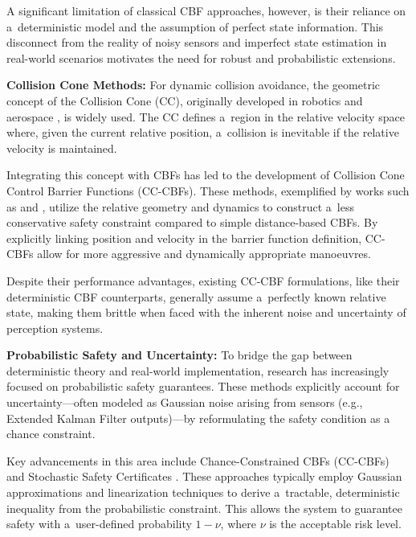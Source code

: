\documentclass{svproc}
\begin{document}
A significant limitation of classical CBF approaches, however, is their reliance
on a~deterministic model and the assumption of perfect state information. This
disconnect from the reality of noisy sensors and imperfect state estimation in
real-world scenarios motivates the need for robust and probabilistic extensions.

\textbf{Collision Cone Methods:}
For dynamic collision avoidance, the geometric concept of the Collision Cone
(CC), originally developed in robotics and aerospace
\cite{chakravarthy1998collision}, is widely used. The CC defines a~region in
the relative velocity space where, given the current relative position,
a~collision is inevitable if the relative velocity is maintained.

Integrating this concept with CBFs has led to the development of Collision Cone
Control Barrier Functions (CC-CBFs). These methods, exemplified by works such as
\cite{wang2022observer} and \cite{tayal2024collisionconeapproachcontrol},
utilize the relative geometry and dynamics to construct a~less conservative
safety constraint compared to simple distance-based CBFs. By explicitly linking
position and velocity in the barrier function definition, CC-CBFs allow for more
aggressive and dynamically appropriate manoeuvres.

Despite their performance advantages, existing CC-CBF formulations, like their
deterministic CBF counterparts, generally assume a~perfectly known relative
state, making them brittle when faced with the inherent noise
and uncertainty of perception systems.

\textbf{Probabilistic Safety and Uncertainty:}
To bridge the gap between deterministic theory and real-world implementation,
research has increasingly focused on probabilistic safety guarantees. These
methods explicitly account for uncertainty—often modeled as Gaussian noise
arising from sensors (e.g., Extended Kalman Filter outputs)—by reformulating
the safety condition as a chance constraint.

Key advancements in this area include Chance-Constrained CBFs (CC-CBFs)
\cite{black2022probabilistic, singletary2023chance} and Stochastic Safety
Certificates \cite{dean2020guaranteeing}. These approaches typically employ
Gaussian approximations and linearization techniques to derive a~tractable,
deterministic inequality from the probabilistic constraint. This allows the
system to guarantee safety with a~user-defined probability $1-\nu$, where
$\nu$ is the acceptable risk level.
\end{document}
